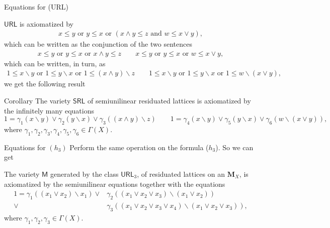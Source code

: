 \documentclass[professionalfont, handout, 10pt]{beamer} %
\theoremstyle{plain}
\theoremstyle{definition}
\begin{document}
\begin{frame}{Equations for (URL)}

$\mathsf{URL}$ is axiomatized by
\begin{align*}
    x \leq y \text{ or } y \leq x \text{ or } (x \wedge y \leq z \text{ and } w \leq x \vee y ),
\end{align*}
\pause
which can be written as the conjunction of the two sentences
\begin{align*}
    x \leq y \text{ or } y \leq x \text{ or } x \wedge y \leq z \qquad
        x \leq y \text{ or } y \leq x \text{ or }w \leq x \vee y,
\end{align*}
\pause
which can be written, in turn, as
\begin{align*}
    1 \leq x \backslash y \text{ or } 1 \leq y \backslash x \text{ or } 1 \leq (x \wedge y) \backslash z \qquad
    1 \leq x \backslash y \text{ or } 1 \leq y \backslash x \text{ or }  1 \leq w \backslash (x \vee y),
\end{align*}
\pause
we get the following result
\begin{block}{Corollary}
    The variety $\mathsf{SRL}$ of semiunilinear residuated lattices is axiomatized by the infinitely many equations 
    $$1 = \gamma_1(x \backslash y) \vee \gamma_2(y \backslash x) \vee \gamma_3 ((x \wedge y) \backslash z) \qquad 1 = \gamma_4(x \backslash y) \vee \gamma_5(y \backslash x) \vee \gamma_6 (w \backslash (x \vee y)),$$
    where $ \gamma_1, \gamma_2, \gamma_3, \gamma_4, \gamma_5, \gamma_6 \in \Gamma(X)$. 
\end{block}
\end{frame}

\begin{frame}{Equations for $(h_3)$}
Perform the same operation on the formula ($h_3$). \pause
So we can get
\begin{block}{}
    The variety $\mathsf{M}$ generated by the class $\mathsf{URL}_3$, of residuated lattices on an $\mathbf{M}_X$, is axiomatized by the semiunilinear equations together with the equations 
    \begin{align*}
        1 = \gamma_1((x_1 \vee x_2)\backslash x_1) \vee & \gamma_2((x_1 \vee x_2 \vee x_3)\backslash (x_1 \vee x_2))\\
        \vee & \gamma_3((x_1 \vee x_2 \vee x_3 \vee x_4) \backslash (x_1 \vee x_2 \vee x_3)),
    \end{align*}
    where $\gamma_1, \gamma_2, \gamma_3 \in \Gamma(X)$.
\end{block}

\end{frame}
\end{document}
